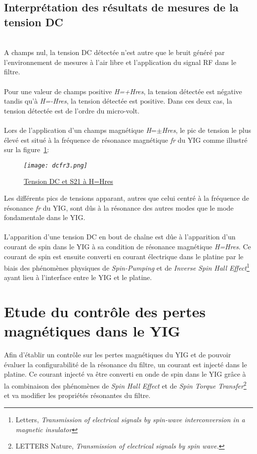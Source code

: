 \documentclass[12pt,fleqn]{book} %
\begin{document}
\section{Interprétation des résultats de mesures de la tension DC}
~\\\noindent A champs nul, la tension DC détectée n'est autre que le bruit généré par l'environnement de mesures à l'air libre et l'application du signal RF dans le filtre.
~\\\\Pour une valeur de champs positive \emph{H=+Hres}, la tension détectée est négative tandis qu'à \emph{H=-Hres}, la tension détectée est positive. Dans ces deux cas, la tension détectée est de l'ordre du micro-volt.
~\\\\Lors de l'application d'un champs magnétique \emph{H}=$\pm$\emph{Hres}, le pic de tension le plus élevé est situé à la fréquence de résonance magnétique \emph{fr} du YIG comme illustré sur la figure~\underline{\color{blue}\ref{dcfr}}:
\begin{figure}[H]
	\centering
	\itshape
	\texttt{[image: dcfr3.png]}
	\caption{\label{dcfr} \underline{Tension DC et S21 à H=Hres}}
\end{figure}
\noindent Les différents pics de tensions apparant, autres que celui centré à la fréquence de résonance \emph{fr} du YIG, sont dûs à la résonance des autres modes que le mode fondamentale dans le YIG. 
~\\\\L'apparition d'une tension DC en bout de chaîne est dûe à l'apparition d'un courant de spin dans le YIG à sa condition de résonance magnétique \emph{H=Hres}. Ce courant de spin est ensuite converti en courant électrique dans le platine par le biais des phénomènes physiques de \emph{Spin-Pumping} et de \emph{Inverse Spin Hall Effect}\footnote{Letters, \emph{Transmission of electrical signals by spin-wave interconversion in a magnetic insulator}} ayant lieu à l'interface entre le YIG et le platine.
\chapter{Etude du contrôle des pertes magnétiques dans le YIG}
Afin d'établir un contrôle sur les pertes magnétiques du YIG et de pouvoir évaluer la configurabilité de la résonance du filtre, un courant est injecté dans le platine. Ce courant injecté va être converti en onde de spin dans le YIG grâce à la combinaison des phénomènes de \emph{Spin Hall Effect} et de \emph{Spin Torque Transfer}\footnote{LETTERS Nature, \emph{Transmission of electrical signals by spin wave.}} et va modifier les propriétés résonantes du filtre.
\end{document}
